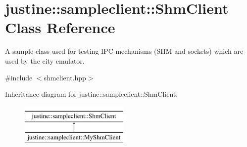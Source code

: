 \hypertarget{classjustine_1_1sampleclient_1_1ShmClient}{\section{justine\-:\-:sampleclient\-:\-:Shm\-Client Class Reference}
\label{classjustine_1_1sampleclient_1_1ShmClient}
}


A sample class used for testing I\-P\-C mechanisms (S\-H\-M and sockets) which are used by the city emulator.  




{\ttfamily \#include $<$shmclient.\-hpp$>$}

Inheritance diagram for justine\-:\-:sampleclient\-:\-:Shm\-Client\-:\begin{figure}[H]
\begin{center}
\leavevmode
\includegraphics[height=2.000000cm]{classjustine_1_1sampleclient_1_1ShmClient}
\end{center}
\end{figure}
